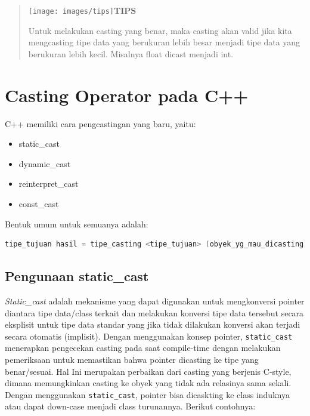 \begin{quotation}

\texttt{[image: images/tips]}\textbf{TIPS} 

Untuk melakukan casting yang benar, maka casting akan valid jika kita mengcasting tipe data yang berukuran lebih besar menjadi tipe data yang berukuran lebih kecil. Misalnya float dicast menjadi int.
\end{quotation}


\section{Casting Operator pada C++}\label{casting-operator-pada-c}

C++ memiliki cara pengcastingan yang baru, yaitu:

\begin{itemize}

\item
  static\_cast
\item
  dynamic\_cast
\item
  reinterpret\_cast
\item
  const\_cast
\end{itemize}

Bentuk umum untuk semuanya adalah:

\begin{lstlisting}[language=c++, numbers=none]
tipe_tujuan hasil = tipe_casting <tipe_tujuan> (obyek_yg_mau_dicasting);
\end{lstlisting}

\subsection{Pengunaan static\_cast}\label{pengunaan-staticux5fcast}

\emph{Static\_cast} adalah mekanisme yang dapat digunakan untuk
mengkonversi pointer diantara tipe data/class terkait dan melakukan
konversi tipe data tersebut secara eksplisit untuk tipe data standar
yang jika tidak dilakukan konversi akan terjadi secara otomatis
(implisit). Dengan menggunakan konsep pointer, \texttt{static\_cast}
menerapkan pengecekan casting pada saat compile-time dengan melakukan
pemeriksaan untuk memastikan bahwa pointer dicasting ke tipe yang
benar/sesuai. Hal Ini merupakan perbaikan dari casting yang berjenis
C-style, dimana memungkinkan casting ke obyek yang tidak ada relasinya
sama sekali. Dengan menggunakan \texttt{static\_cast}, pointer bisa
dicaskting ke class induknya atau dapat down-case menjadi class
turunannya. Berikut contohnya:

